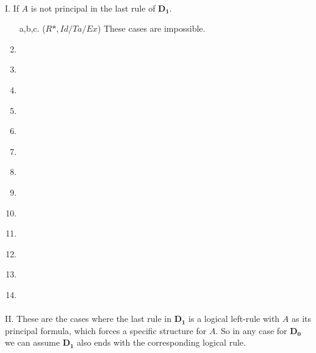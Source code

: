 \begin{enumerate}
	\paragraph{} I. If $A$ is not principal in the last rule of $\mathbf{D_1}$.
	
	\begin{enumerate}[label={\alph*.}]
		\item[a,b,c.] ($R*, Id/Ta/Ex$) These cases are impossible.
		\setcounter{enumii}{3}

		\item \label{c:*-lw} 
		
		\item \label{c:*-rw} 
		
		\item \label{c:*-lc} 

		\item \label{c:*-cut} 


		\item \label{c:*-la1} 
		
		\item \label{c:*-la2} 
		
		\item \label{c:*-ra} 
		
		\item \label{c:*-lo} 
		
		\item \label{c:*-ro1} 
		
		\item \label{c:*-ro2} 
		
		\item \label{c:*-li} 
		
		\item \label{c:*-ri} 
		
		

		\item \label{c:*-n} 
	\end{enumerate}

	\paragraph{} II. These are the cases where the last rule in $\mathbf{D_1}$ is a logical left-rule with $A$ as its principal formula, which forces a specific structure for $A$. So in any case for $\mathbf{D_0}$ we can assume $\mathbf{D_1}$ also ends with the corresponding logical rule.


\end{enumerate}
